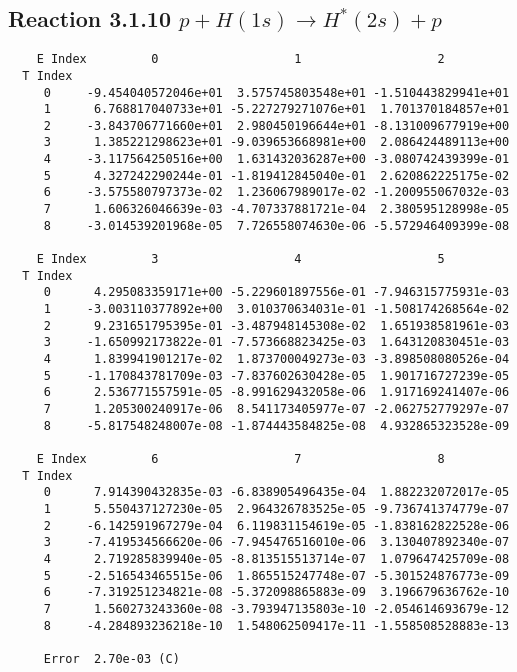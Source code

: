 \documentclass[12pt]{article}
\begin{document}
                               


\newpage
\subsection{
Reaction 3.1.10 $  p + H(1s) \rightarrow H^*(2s) + p$}


\begin{small}\begin{verbatim}
    E Index         0                   1                   2
  T Index
     0     -9.454040572046e+01  3.575745803548e+01 -1.510443829941e+01
     1      6.768817040733e+01 -5.227279271076e+01  1.701370184857e+01
     2     -3.843706771660e+01  2.980450196644e+01 -8.131009677919e+00
     3      1.385221298623e+01 -9.039653668981e+00  2.086424489113e+00
     4     -3.117564250516e+00  1.631432036287e+00 -3.080742439399e-01
     5      4.327242290244e-01 -1.819412845040e-01  2.620862225175e-02
     6     -3.575580797373e-02  1.236067989017e-02 -1.200955067032e-03
     7      1.606326046639e-03 -4.707337881721e-04  2.380595128998e-05
     8     -3.014539201968e-05  7.726558074630e-06 -5.572946409399e-08

    E Index         3                   4                   5
  T Index
     0      4.295083359171e+00 -5.229601897556e-01 -7.946315775931e-03
     1     -3.003110377892e+00  3.010370634031e-01 -1.508174268564e-02
     2      9.231651795395e-01 -3.487948145308e-02  1.651938581961e-03
     3     -1.650992173822e-01 -7.573668823425e-03  1.643120830451e-03
     4      1.839941901217e-02  1.873700049273e-03 -3.898508080526e-04
     5     -1.170843781709e-03 -7.837602630428e-05  1.901716727239e-05
     6      2.536771557591e-05 -8.991629432058e-06  1.917169241407e-06
     7      1.205300240917e-06  8.541173405977e-07 -2.062752779297e-07
     8     -5.817548248007e-08 -1.874443584825e-08  4.932865323528e-09

    E Index         6                   7                   8
  T Index
     0      7.914390432835e-03 -6.838905496435e-04  1.882232072017e-05
     1      5.550437127230e-05  2.964326783525e-05 -9.736741374779e-07
     2     -6.142591967279e-04  6.119831154619e-05 -1.838162822528e-06
     3     -7.419534566620e-06 -7.945476516010e-06  3.130407892340e-07
     4      2.719285839940e-05 -8.813515513714e-07  1.079647425709e-08
     5     -2.516543465515e-06  1.865515247748e-07 -5.301524876773e-09
     6     -7.319251234821e-08 -5.372098865883e-09  3.196679636762e-10
     7      1.560273243360e-08 -3.793947135803e-10 -2.054614693679e-12
     8     -4.284893236218e-10  1.548062509417e-11 -1.558508528883e-13

     Error  2.70e-03 (C)
\end{verbatim}\end{small}
\end{document}
